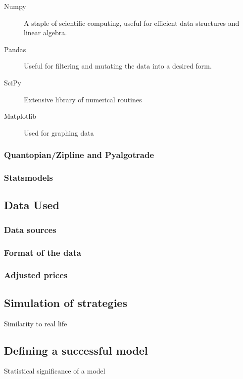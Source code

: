 \documentclass{report}
\begin{document}
\begin{description}

  \item[Numpy] A staple of scientific computing, useful for efficient data structures and linear algebra.
   
  \item[Pandas] Useful for filtering and mutating the data into a desired form.  
  
  \item[SciPy] Extensive library of numerical routines
  
  \item[Matplotlib] Used for graphing data

\end{description}  
 
  
\subsubsection{Quantopian/Zipline and Pyalgotrade}
\subsubsection{Statsmodels}

\subsection{Data Used}
\subsubsection{Data sources}
\subsubsection{Format of the data}
\subsubsection{Adjusted prices}

\subsection{Simulation of strategies}
Similarity to real life

\subsection{Defining a successful model}
Statistical significance of a model
\end{document}
